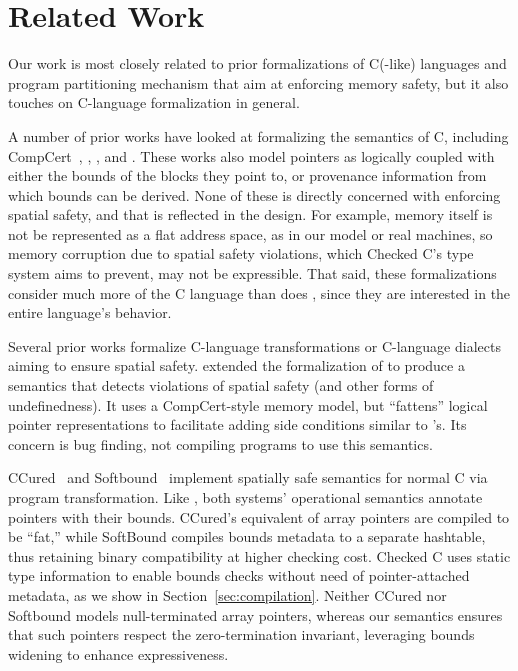 \section{Related Work}
\label{sec:related}

Our work is most closely related to prior formalizations of C(-like)
languages and program partitioning mechanism 
that aim at enforcing memory safety, but it also touches on
C-language formalization in general.


%
A number of prior works have looked at formalizing the semantics of C,
including CompCert~\cite{Blazy2009,leroy:hal-00703441},
\citet{ellison-rosu-2012-popl}, \citet{Kang:2015:FCM:2813885.2738005},
and \citet{10.1145/2980983.2908081, Memarian:2019:ECS:3302515.3290380}. These works also model
pointers as logically coupled with either the bounds of the blocks
they point to, or provenance information from which bounds can be
derived. None of these is directly concerned with enforcing
spatial safety, and that is reflected in the design. For example,
memory itself is not be represented as a flat address space, as in our
model or real machines, so memory corruption due to spatial safety
violations, which Checked C's type system aims to prevent, may not be
expressible. That said, these formalizations consider much more of the
C language than does \lang, since they are interested in the entire
language's behavior.

%
Several prior works formalize C-language transformations or C-language
dialects aiming to ensure spatial safety. 
%
\citet{10.1145/2813885.2737979} extended the formalization
of \citet{ellison-rosu-2012-popl} to produce a semantics that detects
violations of spatial safety (and other forms of undefinedness). It
uses a CompCert-style memory model, but ``fattens'' logical pointer
representations to facilitate adding side conditions similar to \lang's.
Its concern is bug finding, not compiling programs to
use this semantics.

CCured~\cite{Necula2005} and Softbound~\cite{softbound} implement
spatially safe semantics for normal C via program transformation. Like
\lang, both systems' operational semantics annotate pointers with
their bounds. CCured's equivalent of array pointers are compiled to be
``fat,'' while SoftBound compiles bounds metadata to a separate
hashtable, thus retaining binary compatibility at higher checking
cost. Checked C uses static type information to enable bounds checks
without need of pointer-attached metadata, as we show in
Section~\ref{sec:compilation}. Neither CCured nor Softbound models
null-terminated array pointers, whereas our semantics ensures that
such pointers respect the zero-termination invariant, leveraging
bounds widening to enhance expressiveness.


